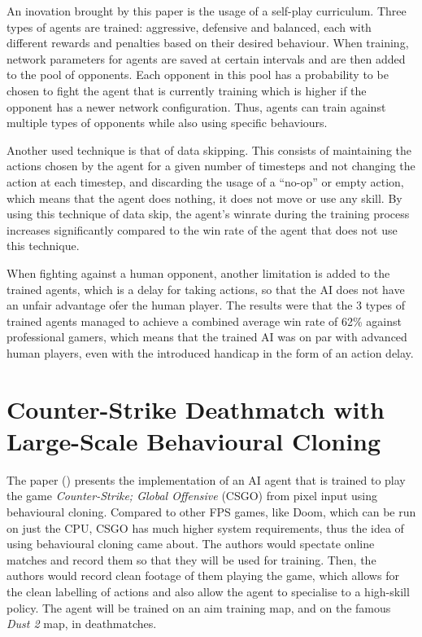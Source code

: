 An inovation brought by this paper is the usage of a self-play curriculum. Three types of agents are trained: aggressive, defensive and balanced, each with different rewards and penalties based on their desired behaviour. When training, network parameters for agents are saved at certain intervals and are then added to the pool of opponents. Each opponent in this pool has a probability to be chosen to fight the agent that is currently training which is higher if the opponent has a newer network configuration. Thus, agents can train against multiple types of opponents while also using specific behaviours.

Another used technique is that of data skipping. This consists of maintaining the actions chosen by the agent for a given number of timesteps and not changing the action at each timestep, and discarding the usage of a \enquote{no-op} or empty action, which means that the agent does nothing, it does not move or use any skill. By using this technique of data skip, the agent's winrate during the training process increases significantly compared to the win rate of the agent that does not use this technique.

When fighting against a human opponent, another limitation is added to the trained agents, which is a delay for taking actions, so that the AI does not have an unfair advantage ofer the human player. The results were that the 3 types of trained agents managed to achieve a combined average win rate of 62\% against professional gamers, which means that the trained AI was on par with advanced human players, even with the introduced handicap in the form of an action delay.



\section{Counter-Strike Deathmatch with Large-Scale Behavioural Cloning}
The paper (\cite{pearce2021counterstrike}) presents the implementation of an AI agent that is trained to play the game \emph{Counter-Strike; Global Offensive} (CSGO) from pixel input using behavioural cloning. Compared to other FPS games, like Doom, which can be run on just the CPU, CSGO has much higher system requirements, thus the idea of using behavioural cloning came about. The authors would spectate online matches and record them so that they will be used for training. Then, the authors would record clean footage of them playing the game, which allows for the clean labelling of actions and also allow the agent to specialise to a high-skill policy. The agent will be trained on an aim training map, and on the famous \emph{Dust 2} map, in deathmatches.

